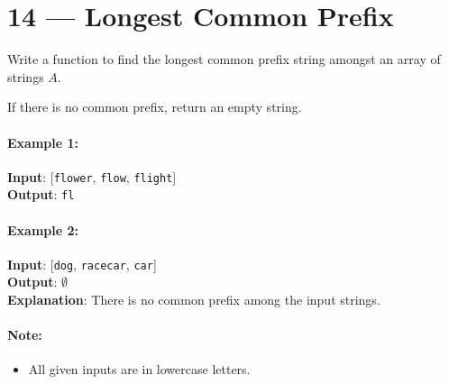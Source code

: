 \section{14 --- Longest Common Prefix}
Write a function to find the longest common prefix string amongst an array of strings $ A $.
\par
If there is no common prefix, return an empty string.

\paragraph{Example 1:}

\begin{flushleft}
\textbf{Input}: [\texttt{flower}, \texttt{flow}, \texttt{flight}]
\\
\textbf{Output}: \texttt{fl}
\end{flushleft}

\paragraph{Example 2:}

\begin{flushleft}
\textbf{Input}: [\texttt{dog}, \texttt{racecar}, \texttt{car}]
\\
\textbf{Output}: $ \emptyset $
\\
\textbf{Explanation}: There is no common prefix among the input strings.
\end{flushleft}

\paragraph{Note:}

\begin{itemize}
\item All given inputs are in lowercase letters.
\end{itemize}

